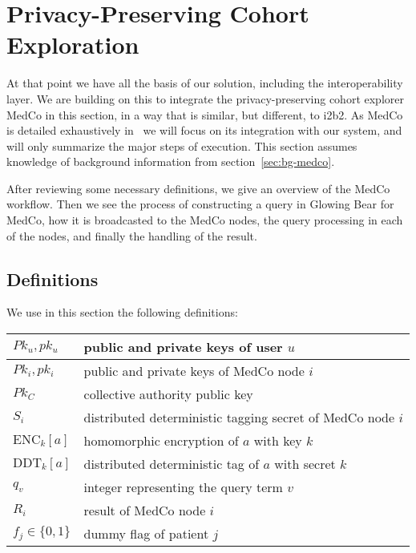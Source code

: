 \chapter{Privacy-Preserving Cohort Exploration}
\label{sec:medco}

At that point we have all the basis of our solution, including the interoperability layer.
We are building on this to integrate the privacy-preserving cohort explorer MedCo in this section, in a way that is similar, but different, to i2b2.
As MedCo is detailed exhaustively in~\cite{todo} we will focus on its integration with our system, and will only summarize the major steps of execution.
This section assumes knowledge of background information from section~\ref{sec:bg-medco}.

After reviewing some necessary definitions, we give an overview of the MedCo workflow.
Then we see the process of constructing a query in Glowing Bear for MedCo, how it is broadcasted to the MedCo nodes, the query processing in each of the nodes, and finally the handling of the result.


\section*{Definitions}

We use in this section the following definitions:

\begin{center}
\begin{tabular}{|l|l|}
\hline
$Pk_u, pk_u$ & public and private keys of user $u$ \\\hline
$Pk_i, pk_i$ & public and private keys of MedCo node $i$ \\\hline
$Pk_C$ & collective authority public key \\\hline
$S_i$ & distributed deterministic tagging secret of MedCo node $i$ \\\hline
$\text{ENC}_k[a]$ & homomorphic encryption of $a$ with key $k$ \\\hline
$\text{DDT}_k[a]$ & distributed deterministic tag of $a$ with secret $k$ \\\hline
$q_v$ & integer representing the query term $v$ \\\hline
$R_i$ & result of MedCo node $i$ \\\hline
$f_j \in \{0, 1\}$ & dummy flag of patient $j$ \\\hline
\end{tabular}
\end{center}


